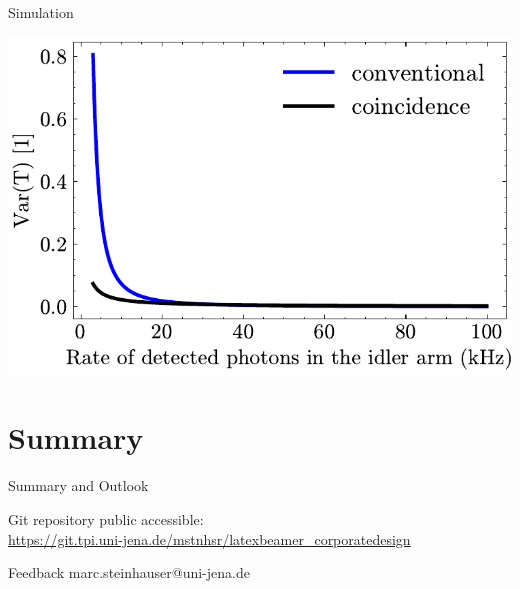 \documentclass[10pt,aspectratio=43]{beamer}
\begin{document}
	\begin{frame}{Simulation}
		\begin{minipage}{.55\textwidth}
			\centering
			\includegraphics[width=\textwidth]{Images/SimulationSweepRateIdl_2}
		\end{minipage}
		\hfill
		\begin{minipage}{.35\textwidth}
		\end{minipage}
	\end{frame}
	
	\section{Summary}
	\begin{frame}{Summary and Outlook}
		\begin{Block}{Git repository}
			public accessible:\\
			{\scriptsize\url{https://git.tpi.uni-jena.de/mstnhsr/latexbeamer_corporatedesign}}
		\end{Block}
		\begin{Block}{Feedback}
			marc.steinhauser@uni-jena.de
		\end{Block}
	\end{frame}
	
\end{document}
